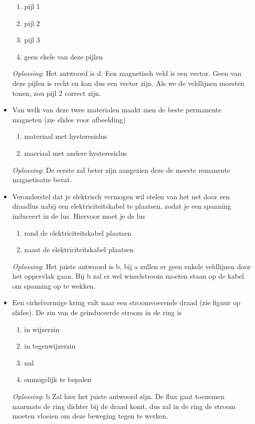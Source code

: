 \documentclass[12pt,a4paper]{article}
\begin{document}
\begin{itemize}
    	\begin{enumerate}[label=\alph*]
    		\item pijl 1
    		\item pijl 2
    		\item pijl 3
    		\item geen ekele van deze pijlen
    	\end{enumerate}
    	\textit{Oplossing}: Het antwoord is d. Een magnetisch veld is een vector. Geen van deze pijlen is recht en kan dus een vector zijn. Als we de veldlijnen moesten tonen, zou pijl 2 correct zijn. 
    	\item Van welk van deze twee materialen maakt men de beste permanente magneten (zie slides voor afbeelding)
    	\begin{enumerate}[label=\alph*]
    		\item materiaal met hysteresislus 
    		\item maeriaal met andere hysteresislus
    	\end{enumerate}
    	\textit{Oplossing}: De eerste zal beter zijn aangezien deze de meeste remanente magnetisatie bevat. 
    	\item Veronderstel dat je elektrisch vermogen wil stelen van het net door een draadlus nabij een elektriciteitskabel te plaatsen, zodat je een spanning induceert in de lus. Hiervoor moet je de lus
    	\begin{enumerate}[label=\alph*]
    		\item rond de elektriciteitskabel plaatsen
    		\item naast de elektriciteitskabel plaatsen
    	\end{enumerate}
    	\textit{Oplossing}: Het juiste antwoord is b, bij a zullen er geen enkele veldlijnen door het oppervlak gaan. Bij b zal er wel wisselstroom moeten staan op de kabel om spanning op te wekken. 
    	\item Een cirkelvormige kring valt naar een stroomvoerende draad (zie figuur op slides). De zin van de geinduceerde stroom in de ring is 
    	\begin{enumerate}[label=\alph*]
    		\item in wijzerzin
    		\item in tegenwijzerzin
    		\item nul
    		\item onmogelijk te bepalen
    	\end{enumerate}
    	\textit{Oplossing}: b Zal hier het juiste antwoord zijn. De flux gaat toenemen naarmate de ring dichter bij de draad komt, dus zal in de ring de stroom moeten vloeien om deze beweging tegen te werken. 

\end{itemize}
\end{document}
